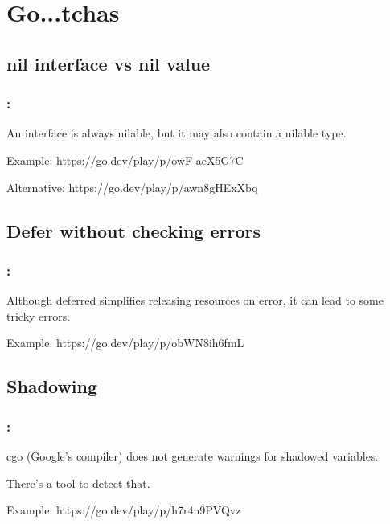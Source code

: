 \section{Go...tchas}

\subsection{nil interface vs nil value}

\begin{frame}
    \frametitle{\secname: \small\subsecname\normalsize}

    An interface is always nilable, but it may also contain a nilable type. \break

    Example: https://go.dev/play/p/owF-aeX5G7C \break

    Alternative: https://go.dev/play/p/awn8gHExXbq
\end{frame}

\subsection{Defer without checking errors}

\begin{frame}
    \frametitle{\secname: \small\subsecname\normalsize}

    Although deferred simplifies releasing resources on error, it can lead to some tricky errors. \break

    Example: https://go.dev/play/p/obWN8ih6fmL
\end{frame}

\subsection{Shadowing}

\begin{frame}
    \frametitle{\secname: \small\subsecname\normalsize}

    cgo (Google's compiler) does not generate warnings for shadowed variables. \break

    There's a tool to detect that. \break

    Example: https://go.dev/play/p/h7r4n9PVQvz
\end{frame}

